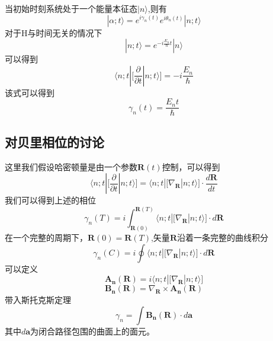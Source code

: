 \documentclass{article}
\begin{document}
当初始时刻系统处于一个能量本征态$ |n\rangle $,则有
\begin{equation}
	|\alpha;t\rangle=e^{i\gamma_n(t)}e^{i\theta_n(t)}|n;t\rangle
\end{equation}
对于H与时间无关的情况下
\begin{equation}
	|n;t\rangle=e^{-i\frac{E_n}{\hbar}t}|n\rangle
\end{equation}
可以得到
\begin{equation}
	\langle n;t|\bigg[\dfrac{\partial}{\partial t}|n;t\rangle\bigg]=-i\frac{E_n}{\hbar}
\end{equation}
该式可以得到
\begin{equation}
	\gamma_n(t)=\frac{E_n t}{\hbar}
\end{equation}
\subsection{对贝里相位的讨论}
这里我们假设哈密顿量是由一个参数$ \boldsymbol{R}(t) $控制，可以得到
\begin{equation}
	\langle n;t|\bigg[\dfrac{\partial}{\partial t}|n;t\rangle\bigg]=	\langle n;t|\bigg[\nabla_{\boldsymbol{R}}|n;t\rangle\bigg]\cdot\dfrac{d\boldsymbol{R}}{dt}
\end{equation}
我们可以得到上述的相位
\begin{equation}
	\gamma_n(T)=i\int_{\boldsymbol{R}(0)}^{\boldsymbol{R}(T)}\langle n;t|\bigg[\nabla_{\boldsymbol{R}}|n;t\rangle\bigg]\cdot d\boldsymbol{R}
\end{equation}
在一个完整的周期下，$ \boldsymbol{R}(0)=\boldsymbol{R}(T) $,矢量$ \boldsymbol{R} $沿着一条完整的曲线积分
\begin{equation}
	\gamma_n(C)=i\oint\langle n;t|\bigg[\nabla_{\boldsymbol{R}}|n;t\rangle\bigg]\cdot d\boldsymbol{R}
\end{equation}
可以定义
\begin{equation}
	\boldsymbol{A_n}(\boldsymbol{R})=i\langle n;t|\bigg[\nabla_{\boldsymbol{R}}|n;t\rangle\bigg]
	\label{eq:15}
\end{equation}
\begin{equation}
	\boldsymbol{B_n}(\boldsymbol{R})=\nabla_{\boldsymbol{R}}\times \boldsymbol{A_n}(\boldsymbol{R})
	\label{eq:16}
\end{equation}
带入斯托克斯定理
\begin{equation}
	\gamma_n=\int \boldsymbol{B_n}(\boldsymbol{R})\cdot d\boldsymbol{a}
\end{equation}
其中$ d\boldsymbol{a} $为闭合路径包围的曲面上的面元。
\end{document}
